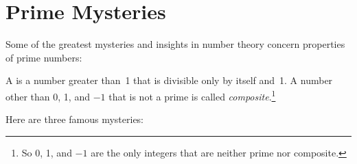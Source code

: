 \begin{problems}

\practiceproblems
{}

\classproblems
{}

\homeworkproblems
{}

\examproblems
{}

\end{problems}

\section{Prime Mysteries}

Some of the greatest mysteries and insights in number theory concern
properties of prime numbers:
\begin{definition}
A  is a number greater than~1 that is divisible only by
itself and~1.  A number other than 0, 1, and $-1$ that is not a prime
is called \emph{composite}.\footnote{So 0, 1, 
and $-1$ are the only integers that are neither prime nor composite.}
\end{definition}

Here are three famous mysteries:


